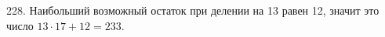 228. Наибольший возможный остаток при делении на 13 равен 12, значит это число $13\cdot17+12=233.$\\
